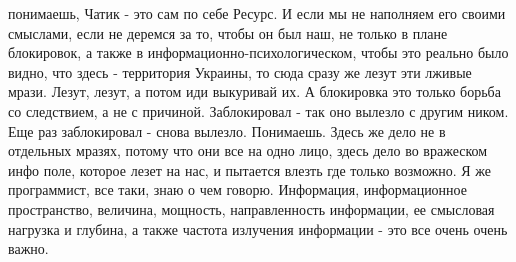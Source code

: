 понимаешь, Чатик - это сам по себе Ресурс. И если мы не наполняем его своими
смыслами, если не деремся за то, чтобы он был наш, не только в плане
блокировок, а также в информационно-психологическом, чтобы это реально было
видно, что здесь - территория Украины, то сюда сразу же лезут эти лживые мрази.
Лезут, лезут, а потом иди выкуривай их. А блокировка это только борьба со
следствием, а не с причиной. Заблокировал - так оно вылезло с другим ником. Еще
раз заблокировал - снова вылезло. Понимаешь. Здесь же дело не в отдельных
мразях, потому что они все на одно лицо, здесь дело во вражеском инфо поле,
которое лезет на нас, и пытается влезть где только возможно. Я же программист,
все таки, знаю о чем говорю. Информация, информационное пространство, величина,
мощность, направленность информации, ее смысловая нагрузка и глубина, а также
частота излучения информации - это все очень очень важно.


